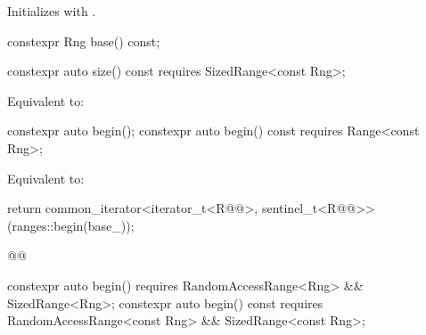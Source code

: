 {\begin{itemdescr}
\pnum
\effects Initializes  with .
\end{itemdescr}

%
\begin{itemdecl}
constexpr Rng base() const;
\end{itemdecl}

\begin{itemdescr}
\pnum
\oldtxt{\returns}  
\end{itemdescr}

%
\begin{itemdecl}
constexpr auto size() const requires SizedRange<const Rng>;
\end{itemdecl}

\begin{itemdescr}
\pnum
\effects Equivalent to: 
\end{itemdescr}

%
\begin{itemdecl}
constexpr auto begin();
constexpr auto begin() const requires Range<const Rng>;
\end{itemdecl}

\begin{itemdescr}
\pnum
{}

\pnum
\effects Equivalent to:
\begin{codeblock}
return common_iterator<iterator_t<R@@>, sentinel_t<R@@>>(ranges::begin(base_));
\end{codeblock}
\begin{codeblock}
@@
\end{codeblock}
\end{itemdescr}

%
\begin{itemdecl}
constexpr auto begin()
  requires RandomAccessRange<Rng> && SizedRange<Rng>;
constexpr auto begin() const
  requires RandomAccessRange<const Rng> && SizedRange<const Rng>;
\end{itemdecl}

}
